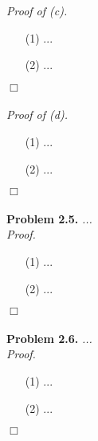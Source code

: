 \documentclass{article}
\begin{document}
\emph{Proof of (c).}
\begin{enumerate}
\item[(1)]
  ...

\item[(2)]
  ...
\end{enumerate}
$\Box$ \\\\



\emph{Proof of (d).}
\begin{enumerate}
\item[(1)]
  ...

\item[(2)]
  ...
\end{enumerate}
$\Box$ \\\\






\textbf{Problem 2.5.}
\emph{...} \\



\emph{Proof.}
\begin{enumerate}
\item[(1)]
  ...

\item[(2)]
  ...
\end{enumerate}
$\Box$ \\\\






\textbf{Problem 2.6.}
\emph{...} \\



\emph{Proof.}
\begin{enumerate}
\item[(1)]
  ...

\item[(2)]
  ...
\end{enumerate}
$\Box$ \\\\



\end{document}

